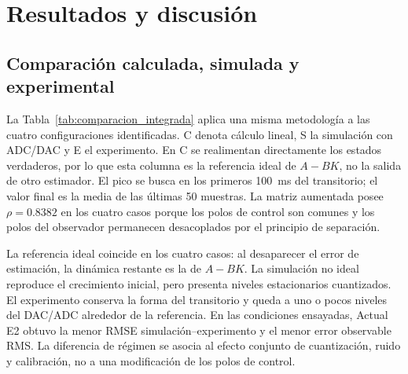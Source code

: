 \section{Resultados y discusión}
\subsection{Comparación calculada, simulada y experimental}
La Tabla~\ref{tab:comparacion_integrada} aplica una misma metodología a las
cuatro configuraciones identificadas. C denota cálculo lineal, S la simulación
con ADC/DAC y E el experimento. En C se realimentan directamente los estados
verdaderos, por lo que esta columna es la referencia ideal de $A-BK$, no la
salida de otro estimador. El pico se busca en los primeros
\SI{100}{\milli\second} del transitorio; el valor final es la media de las
últimas 50 muestras. La matriz aumentada posee $\rho=0.8382$ en los cuatro
casos porque los polos de control son comunes y los polos del observador
permanecen desacoplados por el principio de separación.

\begin{table}[t]
\centering
\caption{Comparación directa con el modelo identificado. Amplitudes, RMSE y
mando en mV; $t_p$ experimental en ms.}
\label{tab:comparacion_integrada}
\small
{}
\end{table}

La referencia ideal coincide en los cuatro casos: al desaparecer el error de
estimación, la dinámica restante es la de $A-BK$. La simulación no ideal
reproduce el crecimiento inicial, pero presenta niveles estacionarios
cuantizados. El experimento conserva la forma del transitorio y queda a uno o
pocos niveles del DAC/ADC alrededor de la referencia. En las condiciones
ensayadas, Actual E2 obtuvo la menor RMSE simulación--experimento y el menor
error observable RMS. La diferencia de régimen se asocia al efecto conjunto de
cuantización, ruido y calibración, no a una modificación de los polos de control.

